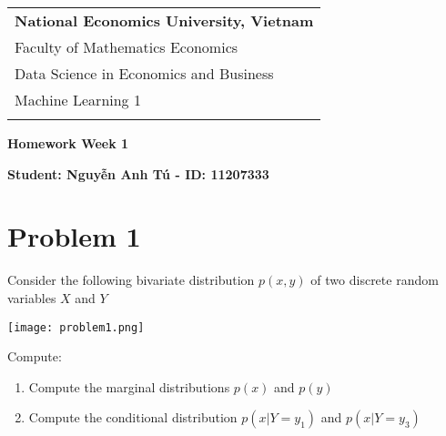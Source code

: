 \documentclass[a4paper, 12pt]{article}  %
\begin{document}
\thispagestyle{empty} %

\begin{tabular}{p{12.5cm}} %
{\large \bf National Economics University, Vietnam} \\
Faculty of Mathematics Economics \\ Data Science in Economics and Business  \\ Machine Learning 1\\
\hline %
\\
\end{tabular} %

\vspace*{0.3cm} %

\begin{center} %
	{\Large \bf Homework Week 1} %
	\vspace{2mm}
	
	{\bf Student: Nguyễn Anh Tú - ID: 11207333} %
\end{center}  

\vspace{0.4cm}

\section{Problem 1}

Consider the following bivariate distribution \(p(x, y)\) of two discrete random variables $X$ and $Y$
\begin{center}
    \texttt{[image: problem1.png]}
\end{center}

Compute:
\begin{enumerate}[label=(\alph*)]
    \item Compute the marginal distributions $p(x)$ and $p(y)$
    \item Compute the conditional distribution $p(x|Y=y_1)$ and $p(x|Y=y_3)$
\end{enumerate}
\end{document}
